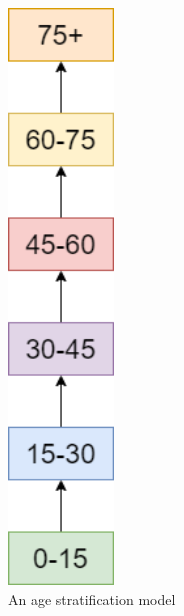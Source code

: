 \begin{appendices}
\begin{figure}
    \centering
    \includegraphics[width=0.25\textwidth]{images/age_stratification.png}
    \caption{An age stratification model}
    \label{fig:age_strat}
\end{figure}


\end{appendices}
